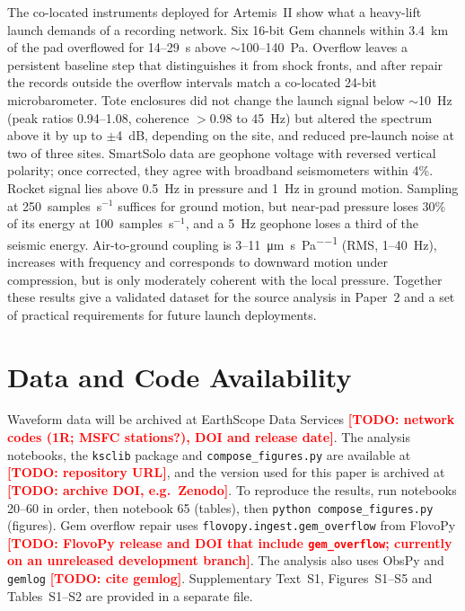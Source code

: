 \documentclass[]{seismica}
\newcommand{\todo}[1]{\textcolor{red}{\textbf{[TODO: #1]}}}
\newcommand{\papertwo}{Paper~2}
\begin{document}
The co-located instruments deployed for Artemis~II show what a
heavy-lift launch demands of a recording network. Six 16-bit Gem
channels within 3.4~km of the pad overflowed for 14--29~s above
$\sim$100--140~Pa. Overflow leaves a persistent baseline step that
distinguishes it from shock fronts, and after repair the records outside
the overflow intervals match a co-located 24-bit microbarometer. Tote
enclosures did not change the launch signal below $\sim$10~Hz (peak
ratios 0.94--1.08, coherence $>$0.98 to 45~Hz) but altered the spectrum
above it by up to $\pm$4~dB, depending on the site, and reduced
pre-launch noise at two of three sites. SmartSolo data are geophone
voltage with reversed vertical polarity; once corrected, they agree with
broadband seismometers within 4\%. Rocket signal lies above 0.5~Hz in
pressure and 1~Hz in ground motion. Sampling at 250~samples~s$^{-1}$
suffices for ground motion, but near-pad pressure loses 30\% of its
energy at 100~samples~s$^{-1}$, and a 5~Hz geophone loses a third of the
seismic energy. Air-to-ground coupling is
3--11~\si{\micro\metre\per\second\per\pascal} (RMS, 1--40~Hz),
increases with frequency and corresponds to downward motion under
compression, but is only moderately coherent with the local pressure.
Together these results give a validated dataset for the source analysis
in \papertwo{} and a set of practical requirements for future launch
deployments.


\section*{Data and Code Availability}

Waveform data will be archived at EarthScope Data Services
\todo{network codes (1R; MSFC stations?), DOI and release date}. The analysis notebooks, the
\texttt{ksclib} package and \texttt{compose\_figures.py} are available
at \todo{repository URL}, and the version used for this paper is
archived at \todo{archive DOI, e.g.\ Zenodo}. To reproduce the results,
run notebooks 20--60 in order, then notebook 65 (tables), then
\texttt{python compose\_figures.py} (figures). Gem overflow repair uses
\texttt{flovopy.ingest.gem\_overflow} from FlovoPy
\citep{flovopy_2026} \todo{FlovoPy release and DOI that include
\texttt{gem\_overflow}; currently on an unreleased development branch}.
The analysis also uses ObsPy \citep{Beyreuther2010,krischer_obspy_2015}
and \texttt{gemlog} \todo{cite gemlog}. Supplementary Text~S1,
Figures~S1--S5 and Tables~S1--S2 are provided in a separate file.
\end{document}
